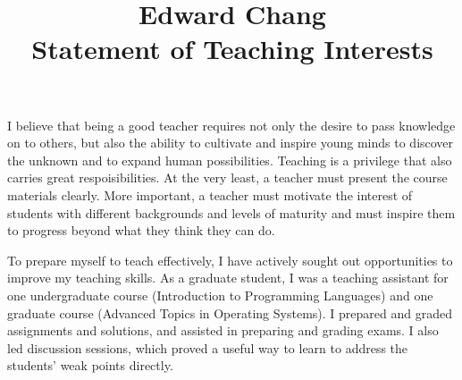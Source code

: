 \setlength{\oddsidemargin}{0in}
\setlength{\evensidemargin}{-0in}
\setlength{\textwidth}{6.4 in}
\setlength{\topmargin}{-.8in}
\setlength{\textheight}{9.2in}

\date{}
\title{{\bf Edward Chang\\Statement of Teaching Interests}}
\author{}

\maketitle
\vspace{-2.0cm}

\def\thepage{}

\vspace{0.3cm}
I believe that being a good teacher requires not only the desire to
pass knowledge on to others, but also the ability to
cultivate and inspire young minds to discover the unknown 
and to expand human possibilities. 
Teaching is a privilege that also carries 
great respoisibilities. At the very least, a teacher must 
present the course materials clearly.  More important,
a teacher must motivate the interest
of students with different backgrounds and levels of
maturity and must inspire them to progress
beyond what they think they can do.

\vspace{0.3cm}
To prepare myself to teach effectively, I have actively sought out
opportunities to improve my teaching skills.
As a graduate student, I was a teaching assistant for
one undergraduate course (Introduction to Programming Languages)
and one graduate course (Advanced Topics in Operating Systems).
I prepared and graded assignments and solutions, and assisted 
in preparing and grading exams. I also led discussion 
sessions, which proved a useful way to learn to address the 
students' weak points directly. 

